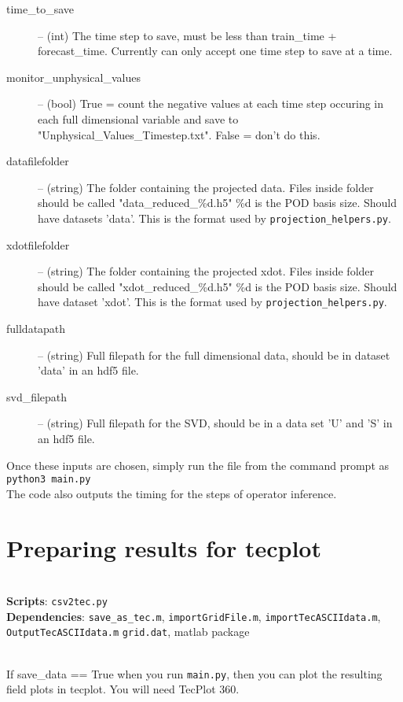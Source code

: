 \documentclass[11pt]{article} %
\newcommand{\code}[1]{\colorbox{light-gray}{\texttt{#1}}}
\begin{document}
\begin{description}
	\item[time\_to\_save] -- (int) The time step to save, must be less than train\_time + forecast\_time. Currently can only accept one time step to save at a time. 

	\item[monitor\_unphysical\_values] -- (bool) True = count the negative values at each time step occuring in each full dimensional variable and save to "Unphysical\_Values\_Timestep.txt". False = don't do this. 

	\item[datafilefolder] -- (string) The folder containing the projected data. Files inside folder should be called "data\_reduced\_\%d.h5" \%d is the POD basis size. Should have datasets 'data'. This is the format used by \code{projection\_helpers.py}.

	\item[xdotfilefolder] -- (string) The folder containing the projected xdot. Files inside folder should be called "xdot\_reduced\_\%d.h5" \%d is the POD basis size. Should have dataset 'xdot'. This is the format used by \code{projection\_helpers.py}.

	\item[fulldatapath] -- (string) Full filepath for the full dimensional data, should be in dataset 'data' in an hdf5 file. 

	\item[svd\_filepath] -- (string) Full filepath for the SVD, should be in a data set 'U' and 'S' in an hdf5 file.

\end{description}
\noindent Once these inputs are chosen, simply run the file from the command prompt as \\
\indent \code{python3 main.py}\\

\noindent The code also outputs the timing for the steps of operator inference. 
\newpage
\section{Preparing results for tecplot}
\hrulefill\\
\textbf{Scripts}: \code{csv2tec.py}\\
\textbf{Dependencies}: \code{save\_as\_tec.m}, \code{importGridFile.m}, \code{importTecASCIIdata.m}, \code{OutputTecASCIIdata.m} \code{grid.dat}, matlab package

\noindent\hrulefill\\
If save\_data == True when you run \code{main.py}, then you can plot the resulting field plots in tecplot. You will need TecPlot 360. \\
\end{document}
